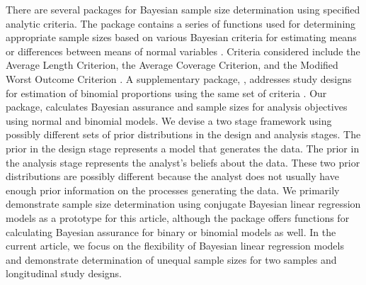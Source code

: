 There are several  packages for Bayesian sample size determination using specified analytic criteria. The  package %
contains a series of functions used for determining appropriate sample sizes based on various Bayesian criteria for estimating means or differences between means of normal variables \citep{samplesizemeans}. Criteria considered include the Average Length Criterion,  the Average Coverage Criterion, and the  Modified Worst Outcome Criterion  \citep{joseph1995, joseph1997}. A supplementary package, , addresses study designs for estimation of binomial proportions using the same set of criteria \citep{samplesizeprop}. 
Our package,  calculates Bayesian assurance and sample sizes for analysis objectives using normal and binomial models. We devise a two stage framework using possibly different sets of prior distributions in the design and analysis stages. The prior in the design stage represents a model that generates the data. The prior in the analysis stage represents the analyst's beliefs about the data. These two prior distributions are possibly different because the analyst does not usually have enough prior information on the processes generating the data. We primarily demonstrate sample size determination using conjugate Bayesian linear regression models as a prototype for this article, although the  package offers functions for calculating Bayesian assurance for binary or binomial models as well. In the current article, we focus on the flexibility of Bayesian linear regression models and demonstrate determination of unequal sample sizes for two samples and longitudinal study designs. 

